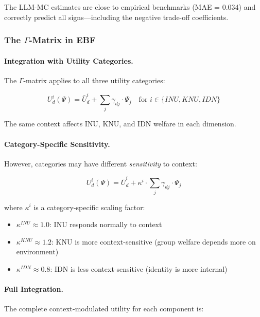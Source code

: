 The LLM-MC estimates are close to empirical benchmarks (MAE = 0.034) and 
correctly predict all signs---including the negative trade-off coefficients.

\subsubsection{The $\Gamma$-Matrix in EBF}

\paragraph{Integration with Utility Categories.}
The $\Gamma$-matrix applies to all three utility categories:

\begin{equation}
U^i_d(\Psi) = \bar{U}^i_d + \sum_{j} \gamma_{dj} \cdot \Psi_j \quad \text{for } i \in \{INU, KNU, IDN\}
\end{equation}

The same context affects INU, KNU, and IDN welfare in each dimension.

\paragraph{Category-Specific Sensitivity.}
However, categories may have different \emph{sensitivity} to context:

\begin{equation}
U^i_d(\Psi) = \bar{U}^i_d + \kappa^i \cdot \sum_{j} \gamma_{dj} \cdot \Psi_j
\end{equation}

where $\kappa^i$ is a category-specific scaling factor:
\begin{itemize}
\item $\kappa^{INU} \approx 1.0$: INU responds normally to context
\item $\kappa^{KNU} \approx 1.2$: KNU is more context-sensitive (group welfare depends more on environment)
\item $\kappa^{IDN} \approx 0.8$: IDN is less context-sensitive (identity is more internal)
\end{itemize}

\paragraph{Full Integration.}
The complete context-modulated utility for each component is:

